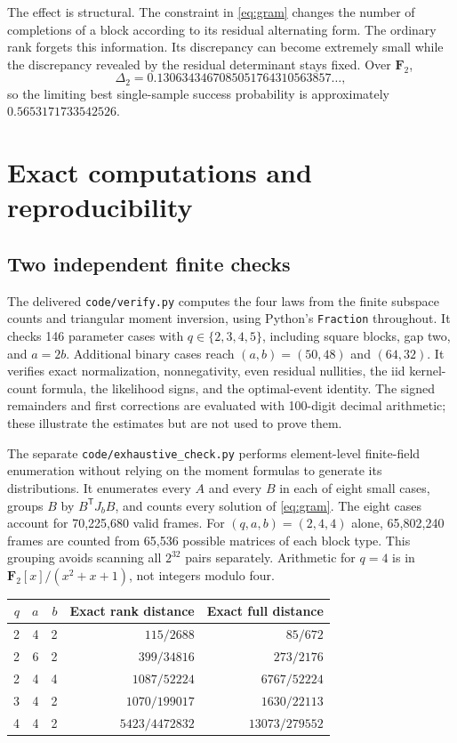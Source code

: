 \documentclass[11pt,letterpaper]{article}
\theoremstyle{remark}
\newcommand{\F}{\mathbf F}
\begin{document}
The effect is structural. The constraint in \eqref{eq:gram} changes the
number of completions of a block according to its residual alternating
form. The ordinary rank forgets this information. Its discrepancy can
become extremely small while the discrepancy revealed by the residual
determinant stays fixed. Over $\F_2$,
\[
 \Delta_2=0.1306343467085051764310563857\ldots,
\]
so the limiting best single-sample success probability is approximately
$0.5653171733542526$.

\section{Exact computations and reproducibility}

\subsection{Two independent finite checks}

The delivered \texttt{code/verify.py} computes the four laws from the
finite subspace counts and triangular moment inversion, using Python's
\texttt{Fraction} throughout. It checks 146 parameter cases with
$q\in\{2,3,4,5\}$, including square blocks, gap two, and $a=2b$.
Additional binary cases reach $(a,b)=(50,48)$ and $(64,32)$.
It verifies exact normalization, nonnegativity, even residual nullities,
the iid kernel-count formula, the likelihood signs, and the optimal-event
identity. The signed remainders and first corrections are evaluated with
100-digit decimal arithmetic; these illustrate the estimates but are not
used to prove them.

The separate \texttt{code/exhaustive\_check.py} performs element-level
finite-field enumeration without relying on the moment formulas to generate
its distributions. It enumerates every $A$ and every $B$ in each of eight
small cases, groups $B$ by $B^{\mathsf T}J_bB$, and counts every solution of
\eqref{eq:gram}. The eight cases account for 70,225,680 valid frames.
For $(q,a,b)=(2,4,4)$ alone, 65,802,240 frames are counted from
65,536 possible matrices of each block type. This grouping avoids scanning
all $2^{32}$ pairs separately. Arithmetic for $q=4$ is in
$\F_2[x]/(x^2+x+1)$, not integers modulo four.

\begin{center}
\begin{tabular}{rrrrr}
\toprule
$q$&$a$&$b$&Exact rank distance&Exact full distance\\
\midrule
2&4&2&$115/2688$&$85/672$\\
2&6&2&$399/34816$&$273/2176$\\
2&4&4&$1087/52224$&$6767/52224$\\
3&4&2&$1070/199017$&$1630/22113$\\
4&4&2&$5423/4472832$&$13073/279552$\\
\bottomrule
\end{tabular}
\end{center}
\end{document}
